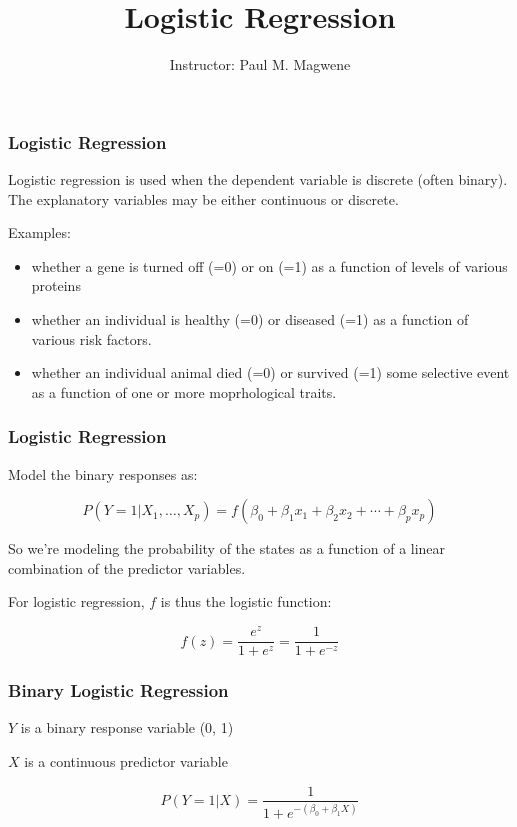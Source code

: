 \documentclass[presentation]{beamer}
\title{Logistic Regression}
\author{Instructor: Paul M. Magwene}
\begin{document}
\begin{frame}
\titlepage
\end{frame}




\begin{frame}
  \frametitle{Logistic Regression}
  
Logistic regression is used when the dependent variable is discrete (often binary).  The explanatory variables may be either continuous or discrete.
\medskip

Examples:
\begin{itemize}
\item whether a gene is turned off (=0) or on (=1) as a function of levels of various proteins
\item whether an individual is healthy (=0) or diseased (=1) as a function of various risk factors.
\item whether an individual animal died (=0) or survived (=1) some selective event as a function of one or more moprhological traits.
\end{itemize}


\end{frame}

\begin{frame}
  \frametitle{Logistic Regression}

Model the binary responses as:

\[P(Y = 1|X_1,\ldots,X_p) = f(\beta_0 + \beta_1 x_1 + \beta_2 x_2 + \cdots + \beta_p x_p)
\]

So we're modeling the probability of the states as a function of a linear combination of the predictor variables.

\medskip


For logistic regression, $f$ is thus the logistic function:

\[
f(z) = \frac{e^z}{1+e^z} = \frac{1}{1 + e^{-z}}
\]

\end{frame}

\begin{frame}
  \frametitle{Binary Logistic Regression}

$Y$ is a binary response variable (0, 1)

$X$ is a continuous predictor variable 

\[
P(Y = 1 | X) = \frac{1}{1+e^{-(\beta_0 + \beta_1 X)}}
\]

\bigskip

\begin{center}
\end{center}

\end{frame}
\end{document}
